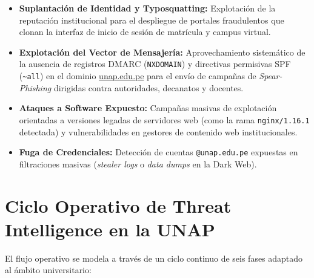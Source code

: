 \begin{itemize}[itemsep=3pt,topsep=2pt,parsep=0pt]
    \item \textbf{Suplantación de Identidad y Typosquatting:} Explotación de la reputación institucional para el despliegue de portales fraudulentos que clonan la interfaz de inicio de sesión de matrícula y campus virtual.
    \item \textbf{Explotación del Vector de Mensajería:} Aprovechamiento sistemático de la ausencia de registros DMARC (\texttt{NXDOMAIN}) y directivas permisivas SPF (\texttt{\textasciitilde all}) en el dominio \url{unap.edu.pe} para el envío de campañas de \textit{Spear-Phishing} dirigidas contra autoridades, decanatos y docentes.
    \item \textbf{Ataques a Software Expuesto:} Campañas masivas de explotación orientadas a versiones legadas de servidores web (como la rama \texttt{nginx/1.16.1} detectada) y vulnerabilidades en gestores de contenido web institucionales.
    \item \textbf{Fuga de Credenciales:} Detección de cuentas \texttt{@unap.edu.pe} expuestas en filtraciones masivas (\textit{stealer logs} o \textit{data dumps} en la Dark Web).
\end{itemize}

\clearpage

\section{Ciclo Operativo de Threat Intelligence en la UNAP}

El flujo operativo se modela a través de un ciclo continuo de seis fases adaptado al ámbito universitario:

